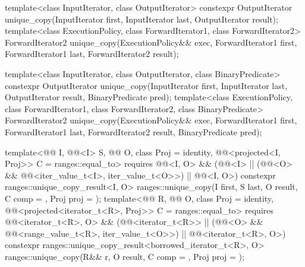 %
\begin{itemdecl}
template<class InputIterator, class OutputIterator>
  constexpr OutputIterator
    unique_copy(InputIterator first, InputIterator last,
                OutputIterator result);
template<class ExecutionPolicy, class ForwardIterator1, class ForwardIterator2>
  ForwardIterator2
    unique_copy(ExecutionPolicy&& exec,
                ForwardIterator1 first, ForwardIterator1 last,
                ForwardIterator2 result);

template<class InputIterator, class OutputIterator,
         class BinaryPredicate>
  constexpr OutputIterator
    unique_copy(InputIterator first, InputIterator last,
                OutputIterator result, BinaryPredicate pred);
template<class ExecutionPolicy, class ForwardIterator1, class ForwardIterator2,
         class BinaryPredicate>
  ForwardIterator2
    unique_copy(ExecutionPolicy&& exec,
                ForwardIterator1 first, ForwardIterator1 last,
                ForwardIterator2 result, BinaryPredicate pred);

template<@@ I, @@<I> S, @@ O, class Proj = identity,
         @@<projected<I, Proj>> C = ranges::equal_to>
  requires @@<I, O> &&
           (@@<I> ||
            (@@<O> && @@<iter_value_t<I>, iter_value_t<O>>) ||
            @@<I, O>)
  constexpr ranges::unique_copy_result<I, O>
    ranges::unique_copy(I first, S last, O result, C comp = {}, Proj proj = {});
template<@@ R, @@ O, class Proj = identity,
         @@<projected<iterator_t<R>, Proj>> C = ranges::equal_to>
  requires @@<iterator_t<R>, O> &&
           (@@<iterator_t<R>> ||
            (@@<O> && @@<range_value_t<R>, iter_value_t<O>>) ||
            @@<iterator_t<R>, O>)
  constexpr ranges::unique_copy_result<borrowed_iterator_t<R>, O>
    ranges::unique_copy(R&& r, O result, C comp = {}, Proj proj = {});


\end{itemdecl}
